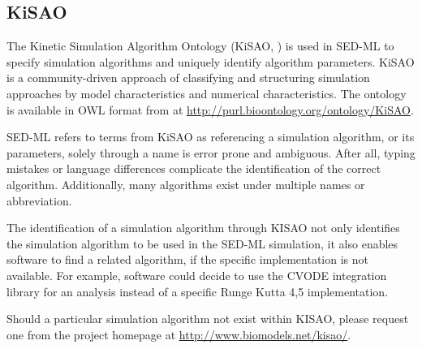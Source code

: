 \subsection{KiSAO}
\label{sec:kisao}

The Kinetic Simulation Algorithm Ontology (KiSAO, \citep{CWK+10}) is 
used in SED-ML to specify simulation algorithms and uniquely identify 
algorithm parameters. KiSAO is a community-driven approach of 
classifying and structuring simulation approaches by model 
characteristics and numerical characteristics. The ontology is available 
in OWL format from  at 
\url{http://purl.bioontology.org/ontology/KiSAO}. 

SED-ML refers to terms from KiSAO as referencing a simulation algorithm, 
or its parameters, solely through a name is error prone and ambiguous. 
After all, typing mistakes or language differences complicate the 
identification of the correct algorithm. Additionally, many algorithms 
exist under multiple names or abbreviation. 

The identification of a simulation algorithm through KISAO not only 
identifies the simulation algorithm to be used in the SED-ML simulation, 
it also enables software to find a related algorithm, if the specific 
implementation is not available. For example, software could decide to 
use the CVODE integration library for an analysis instead of a specific 
Runge Kutta 4,5 implementation. 

Should a particular simulation algorithm not exist within KISAO, please 
request one from the project homepage at 
\url{http://www.biomodels.net/kisao/}. 





